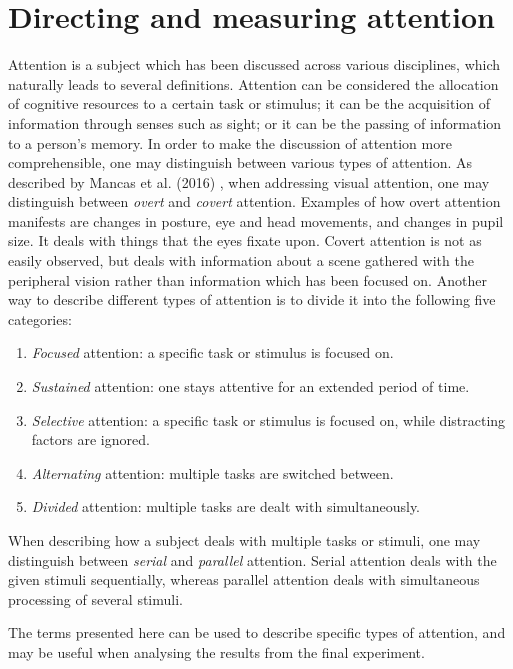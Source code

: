 \chapter{Directing and measuring attention}\label{ch:attention}
Attention is a subject which has been discussed across various disciplines, which naturally leads to several definitions. Attention can be considered the allocation of cognitive resources to a certain task or stimulus; it can be the acquisition of information through senses such as sight; or it can be the passing of information to a person’s memory. In order to make the discussion of attention more comprehensible, one may distinguish between various types of attention. As described by Mancas et al. (2016) \cite{Mancas2016}, when addressing visual attention, one may distinguish between \textit{overt} and \textit{covert} attention. Examples of how overt attention manifests are changes in posture, eye and head movements, and changes in pupil size. It deals with things that the eyes fixate upon. Covert attention is not as easily observed, but deals with information about a scene gathered with the peripheral vision rather than information which has been focused on. Another way to describe different types of attention is to divide it into the following five categories:

\begin{enumerate}
\item \textit{Focused} attention: a specific task or stimulus is focused on.
\item \textit{Sustained} attention: one stays attentive for an extended period of time.
\item \textit{Selective} attention: a specific task or stimulus is focused on, while distracting factors are ignored.
\item \textit{Alternating} attention: multiple tasks are switched between.
\item \textit{Divided} attention: multiple tasks are dealt with simultaneously.
\end{enumerate}

When describing how a subject deals with multiple tasks or stimuli, one may distinguish between \textit{serial} and \textit{parallel} attention. Serial attention deals with the given stimuli sequentially, whereas parallel attention deals with simultaneous processing of several stimuli.

The terms presented here can be used to describe specific types of attention, and may be useful when analysing the results from the final experiment.

